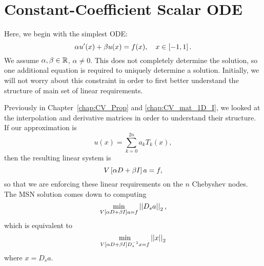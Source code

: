 \section{Constant-Coefficient Scalar ODE}
\label{sec:odes_const}

Here, we begin with the simplest ODE:
%
\begin{equation}
    \label{eq:odes_const}
    \alpha u'(x) + \beta u(x) = f(x), \quad x\in\left[ -1,1 \right].
\end{equation}
%
We assume $\alpha,\beta\in\mathbb{R}$, $\alpha\ne0$.
This does not completely determine the solution,
so one additional equation is required to uniquely
determine a solution. Initially, we will not worry about
this constraint in order to first better understand the structure
of main set of linear requirements.

Previously in Chapter~\ref{chap:CV_Prop} and \ref{chap:CV_mat_1D_I},
we looked at the interpolation \CV{} and derivative \CV{} matrices
in order to understand their structure.
If our approximation is
%
\begin{equation}
    u(x) = \sum_{k=0}^{2n} a_{k}T_{k}(x),
\end{equation}
%
then the resulting linear system is
%
\begin{equation}
    V\left[ \alpha D + \beta I \right]a = f,
\end{equation}
%
so that we are enforcing these linear requirements on the $n$ Chebyshev nodes.
The MSN solution comes down to computing
%
\begin{equation}
    \min_{V\left[ \alpha D + \beta I \right]a = f} \left| \left| D_{s}a \right| \right|_{2},
\end{equation}
%
which is equivalent to
%
\begin{equation}
    \min_{V\left[ \alpha D + \beta I \right]D_{s}^{-1}x = f} \left| \left| x \right| \right|_{2}
\end{equation}
%
where $x = D_{s}a$.

